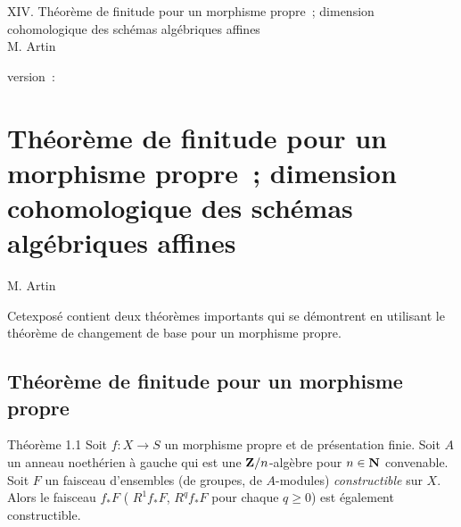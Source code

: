 \documentclass[10pt]{../fichiers-configuration-latex/smfart}
\begin{document}
\begin{center}
XIV. Théorème de finitude pour un morphisme propre ; dimension cohomologique des schémas algébriques affines\\
M. Artin 
\end{center}

version : \showgitstatus{}
\tableofcontents

\else
\chapter{Théorème de finitude pour un morphisme propre ; dimension cohomologique des schémas algébriques affines}
\begin{center}
M. Artin 
\end{center}
\fi

\setcounter{pageoriginal}{144}

\newcommand{\degtr}{{\rm deg.tr.\ }}    %





Cet\pageoriginale exposé contient deux théorèmes importants qui se
démontrent en 
utilisant le théorème de changement de base pour un morphisme propre.

\section{Théorème de finitude pour un morphisme propre}

\begin{enonce*}{Théorème 1.1}
Soit $f:X\rightarrow S$ un morphisme propre et de présentation
finie. Soit $A$ un anneau noethérien à gauche qui est une
$\mathbf{Z}/n$-algèbre pour $n\in \mathbf{N}$ convenable. Soit $F$ un
faisceau d'ensembles (\resp de groupes, \resp de $A$-modules)
\emph{constructible} sur $X$. Alors le faisceau $f_{\ast}F$ (\resp
$R^1f_{\ast}F$, \resp $R^qf_{\ast}F$ pour chaque $q\geq 0$) 
est également constructible.
\end{enonce*}
\end{document}
